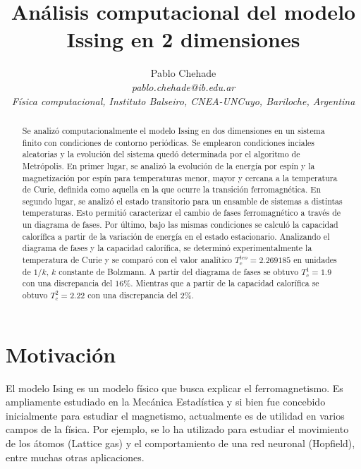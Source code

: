 \documentclass[aps,prb,twocolumn,superscriptaddress,floatfix,longbibliography]{revtex4-2}
\newcounter{para}
\begin{document}
\newcommand{\mytitle}{Análisis computacional del modelo Issing en 2 dimensiones}

\title{\mytitle}

\author{Pablo Chehade \\
    \small \textit{pablo.chehade@ib.edu.ar} \\
    \small \textit{Física computacional, Instituto Balseiro, CNEA-UNCuyo, Bariloche, Argentina} \\}



\begin{abstract}
Se analizó computacionalmente el modelo Issing en dos dimensiones en un sistema finito con condiciones de contorno periódicas. Se emplearon condiciones inciales aleatorias y la evolución del sistema quedó determinada por el algoritmo de Metrópolis. En primer lugar, se analizó la evolución de la energía por espín y la magnetización por espín para temperaturas menor, mayor y cercana a la temperatura de Curie, definida como aquella en la que ocurre la transición ferromagnética. En segundo lugar, se analizó el estado transitorio para un ensamble de sistemas a distintas temperaturas. Esto permitió caracterizar el cambio de fases ferromagnético a través de un diagrama de fases. Por último, bajo las mismas condiciones se calculó la capacidad calorífica a partir de la variación de energía en el estado estacionario. Analizando el diagrama de fases y la capacidad calorífica, se determinó experimentalmente la temperatura de Curie y se comparó con el valor analítico $T_c^{teo} = 2.269185$ en unidades de $1/k$, $k$ constante de Bolzmann. A partir del diagrama de fases se obtuvo $T_c^1 = 1.9$ con una discrepancia del $ 16 \%$. Mientras que a partir de la capacidad calorífica se obtuvo $T_c^2 = 2.22$ con una discrepancia del $ 2\%$.


\end{abstract}

\maketitle

\section{Motivación}

El modelo Ising es un modelo físico que busca explicar el ferromagnetismo. Es ampliamente estudiado en la Mecánica Estadística y si bien fue concebido inicialmente para estudiar el magnetismo, actualmente es de utilidad en varios campos de la física. Por ejemplo, se lo ha utilizado para estudiar el movimiento de los átomos (Lattice gas) y el comportamiento de una red neuronal (Hopfield), entre muchas otras aplicaciones.
\end{document}

